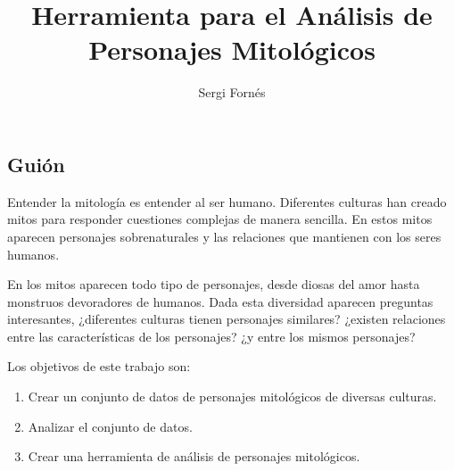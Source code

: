 \documentclass[letterpaper,9pt,twocolumn,twoside,]{pinp}
\title{Herramienta para el Análisis de Personajes Mitológicos}
\author[]{Sergi Fornés}
\providecommand{\tightlist}{%
  \setlength{\itemsep}{0pt}\setlength{\parskip}{0pt}}
\begin{document}
\verticaladjustment{-2pt}

\maketitle
\thispagestyle{firststyle}



\hypertarget{guiuxf3n}{%
\subsection{Guión}\label{guiuxf3n}}

Entender la mitología es entender al ser humano. Diferentes culturas han
creado mitos para responder cuestiones complejas de manera sencilla. En
estos mitos aparecen personajes sobrenaturales y las relaciones que
mantienen con los seres humanos.

En los mitos aparecen todo tipo de personajes, desde diosas del amor
hasta monstruos devoradores de humanos. Dada esta diversidad aparecen
preguntas interesantes, ¿diferentes culturas tienen personajes
similares? ¿existen relaciones entre las características de los
personajes? ¿y entre los mismos personajes?

Los objetivos de este trabajo son:

\begin{enumerate}
\def\labelenumi{\arabic{enumi}.}
\tightlist
\item
  Crear un conjunto de datos de personajes mitológicos de diversas
  culturas.
\item
  Analizar el conjunto de datos.
\item
  Crear una herramienta de análisis de personajes mitológicos.
\end{enumerate}
\end{document}
